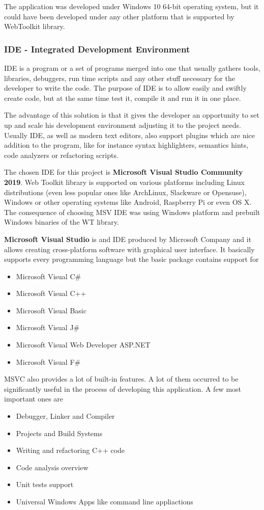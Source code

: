 \documentclass[a4paper,12pt]{article}
\makeatletter
\newcommand{\ttvar}{\begingroup\@makeother\#\@ttvar}
\newcommand{\@ttvar}[1]{\ttfamily\detokenize{#1}\endgroup}
\newcommand\tab[1][1cm]{\hspace*{#1}}
\makeatother
\begin{document}
{The application was developed under Windows 10 64-bit operating system, but it could have been developed under any other platform that is supported by WebToolkit library.

\newpage
\subsubsection*{IDE - Integrated Development Environment}
{
\tab IDE is a program or a set of programs merged into one that usually gathers tools, libraries, debuggers, run time scripts and any other stuff necessary for the developer to write the code. The purpose of IDE is to allow easily and swiftly create code, but at the same time test it, compile it and run it in one place. 

\bigskip
The advantage of this solution is that it gives the developer an opportunity to set up and scale his development environment adjusting it to the project needs. Usually IDE, as well as modern text editors, also support plugins which are nice addition to the program, like for instance syntax highlighters, semantics hints, code analyzers or refactoring scripts.

\bigskip
The chosen IDE for this project is \textbf{Microsoft Visual Studio Community 2019}. Web Toolkit library is supported on various platforms including Linux distributions (even less popular ones like ArchLinux, Slackware or Opensuse), Windows or other operating systems like Android, Raspberry Pi or even OS X. The consequence of choosing MSV IDE was using Windows platform and prebuilt Windows binaries of the WT library.

\bigskip
\textbf{Microsoft Visual Studio} is and IDE produced by Microsoft Company and it allows creating cross-platform software with graphical user interface. It basically supports every programming language but the basic package contains support for 
\begin{itemize}
	\item Microsoft Visual C\ttvar{#}
	\item Microsoft Visual C++
	\item Microsoft Visual Basic
	\item Microsoft Visual J\ttvar{#}
	\item Microsoft Visual Web Developer ASP.NET
	\item Microsoft Visual F\ttvar{#}
\end{itemize}

MSVC also provides a lot of built-in features. A lot of them occurred to be significantly useful in the process of developing this application. A few most important ones are
\begin{itemize}
	\item Debugger, Linker and Compiler
	\item Projects and Build Systems
	\item Writing and refactoring C++ code
	\item Code analysis overview
	\item Unit tests support
	\item Universal Windows Apps like command line appliactions
\end{itemize}

}}
\end{document}
